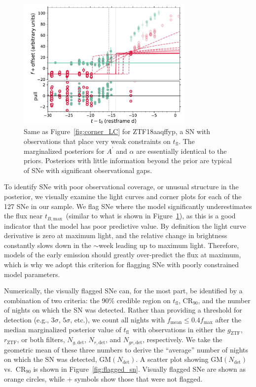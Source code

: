 \documentclass[twocolumn]{./aastex63}
\newcommand{\rztf}{$r_\mathrm{ZTF}$}
\newcommand{\gztf}{$g_\mathrm{ZTF}$}
\newcommand{\tfl}{$t_\mathrm{fl}$}
\newcommand{\tbmax}{$t_{B,\mathrm{max}}$}
\begin{document}
\begin{figure}
    \centering
    \includegraphics[width=3.4in]{./figures/ZTF18aaqffyp_model_lc.pdf}
    \caption{Same as Figure~\ref{fig:corner_LC} for ZTF18aaqffyp, a SN with
    observations that place very weak constraints on \tfl. The marginalized
    posteriors for $A^\prime$ and $\alpha$ are essentially identical to the
    priors. Posteriors with little information beyond the prior are typical
    of SNe with significant observational gaps.}
    \label{fig:biggap_lc}
\end{figure}

To identify SNe with poor observational coverage, or unusual structure in the
posterior, we visually examine the light curves and corner plots for each of
the 127 SNe in our sample. We flag SNe where the model significantly
underestimates the flux near \tbmax\ (similar to what is shown in
Figure~\ref{fig:biggap_lc}), as this is a good indicator that the model has
poor predictive value. By definition the light curve derivative is zero at
maximum light, and the relative change in brightness constantly slows down in
the $\sim$week leading up to maximum light. Therefore, models of the early
emission should greatly over-predict the flux at maximum, which is why we
adopt this criterion for flagging SNe with poorly constrained model
parameters.

Numerically, the visually flagged SNe can, for the most part, be identified
by a combination of two criteria: the 90\% credible region on \tfl,
$\mathrm{CR}_{90}$, and the number of nights on which the SN was detected.
Rather than providing a threshold for detection (e.g., $3\sigma$, $5\sigma$,
etc.), we count all nights with $f_\mathrm{mean} \le 0.4 f_\mathrm{max}$
after the median marginalized posterior value of \tfl\ with observations in
either the \gztf, \rztf, or both filters, $N_{g, \mathrm{det}}$, $N_{r,
\mathrm{det}}$, and $N_{gr, \mathrm{det}}$, respectively. We take the
geometric mean of these three numbers to derive the ``average'' number of
nights on which the SN was detected, $\mathrm{GM}(N_\mathrm{det})$. A scatter
plot showing $\mathrm{GM}(N_\mathrm{det})$ vs.\ $\mathrm{CR}_{90}$ is shown
in Figure~\ref{fig:flagged_sn}. Visually flagged SNe are shown as orange
circles, while $+$ symbols show those that were not flagged.
\end{document}
